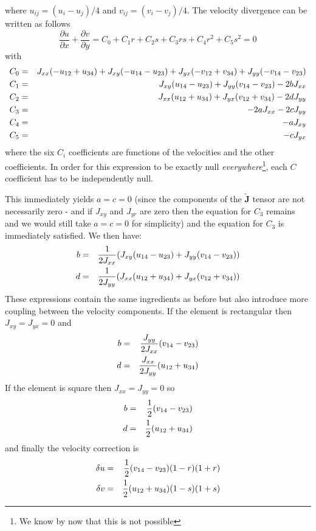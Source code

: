 where $u_{ij}=(u_i-u_j)/4$ and $v_{ij}=(v_i-v_j)/4$.
The velocity divergence can be written as follows
\[
\frac{\partial u}{\partial x} 
+\frac{\partial v}{\partial y} = C_0 +C_1 r + C_2 s + C_3 rs + C_4 r^2 + C_5 s^2 =0
\]
with
\begin{eqnarray}
C_0 &=& J_{xx} (-u_{12} + u_{34} ) + J_{xy} (- u_{14} - u_{23} )  + J_{yx}  (-v_{12} + v_{34}) + J_{yy} (-v_{14} - v_{23} )  \nonumber\\ 
C_1 &=& J_{xy} (u_{14} - u_{23}) + J_{yy} (v_{14} - v_{23}) - 2 b J_{xx}   \nonumber\\ 
C_2 &=& J_{xx} (u_{12} + u_{34}) + J_{yx} ( v_{12} + v_{34} )  - 2 d J_{yy}    \nonumber\\ 
C_3 &=& -2 a J_{xx}  -2 c J_{yy} \nonumber\\ 
C_4 &=& -a J_{xy}  \nonumber\\
C_5 &=& -c J_{yx}  \nonumber\\
\end{eqnarray}
where the six $C_i$ coefficients are functions of the velocities and the other coefficients.
In order for this expression to be exactly null {\it everywhere}\footnote{We know by now 
that this is not possible}, each $C$ coefficient has
to be independently null.

This immediately yields $a=c=0$ (since the components of the $\tilde{\bm J}$ tensor
are not necessarily zero - and if $J_{xy}$ and $J_{yr}$ are zero then the equation 
for $C_3$ remains and we would still take $a=c=0$ for simplicity) and the equation for $C_3$ is immediately satisfied.
We then have:
\begin{eqnarray}
b&=&\frac{1}{2J_{xx}} ( J_{xy} (u_{14} - u_{23}) + J_{yy} (v_{14} - v_{23})  )  \nonumber\\
d&=&\frac{1}{2J_{yy}} ( J_{xx} (u_{12} + u_{34}) + J_{yx} ( v_{12} + v_{34} ) ) \nonumber
\end{eqnarray}
These expressions contain the same ingredients as before but also 
introduce more coupling between the velocity components. 
If the element is rectangular then $J_{xy}=J_{yx}=0$ and 
\begin{eqnarray}
b&=&\frac{J_{yy}}{2J_{xx}} ( v_{14} - v_{23} ) \nonumber\\
d&=&\frac{J_{xx}}{2J_{yy}} ( u_{12} + u_{34} ) \nonumber
\end{eqnarray}
If the element is square then $J_{xx}=J_{yy}=0$ so 
\begin{eqnarray}
b&=&\frac{1}{2} ( v_{14} - v_{23} ) \nonumber\\
d&=&\frac{1}{2} ( u_{12} + u_{34} ) \nonumber
\end{eqnarray}
and finally the velocity correction is 
\begin{eqnarray}
\delta u&=&\frac{1}{2} ( v_{14} - v_{23} ) (1-r)(1+r)\nonumber\\
\delta v&=&\frac{1}{2} ( u_{12} + u_{34} ) (1-s)(1+s)\label{eq:cvi_corr1}
\end{eqnarray}

